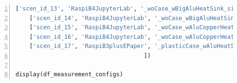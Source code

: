\documentclass[10pt,parskip=half,
toc=sectionentrywithdots,
bibliography=totocnumbered,
captions=tableheading,numbers=noendperiod]{scrartcl}
\begin{document}
\begin{codecell}[H]
\begin{lstlisting}[language=Python,numbers=left,xleftmargin=20pt,xrightmargin=5pt,belowskip=5pt,aboveskip=5pt]
    ['scen_id_13', 'RaspiB4JupyterLab', '_woCase_wBigAluHeatSink_siliconPads_CtrlFan70C', 'R4, Without Case with large aluminum heat sink, glued-on by silicone pads, with ctrl fan (switch-on: 70 $^\circ$C)'],
    ['scen_id_14', 'RaspiB4JupyterLab', '_woCase_wBigAluHeatSink_siliconPads_CtrlFan65C', 'R4, Without Case with large aluminum heat sink, glued-on by silicone pads, with ctrl fan (switch-on: 65 $^\circ$C)'],
    ['scen_id_15', 'RaspiB4JupyterLab', '_woCase_wAluCopperHeatPipes_siliconPads_wFan5V', 'R4, Without Case with large aluminum heat sink and copper heat pipes, glued-on by silicone pads, with fan (5 V)'],
    ['scen_id_16', 'RaspiB4JupyterLab', '_woCase_wAluCopperHeatPipes_siliconPads_wFan3V', 'R4, Without Case with large aluminum heat sink and copper heat pipes, glued-on by silicone pads, with fan (3.3 V)'],
    ['scen_id_17', 'RaspiB3plusEPaper', '_plasticCase_wAluHeatSinks_thermalTape_woFan', 'R3+, Plastic Case with glued-on aluminum heat sinks by thermal tape, without fan']
                                     ])

display(df_measurement_configs)
\end{lstlisting}\end{codecell}
\end{document}
